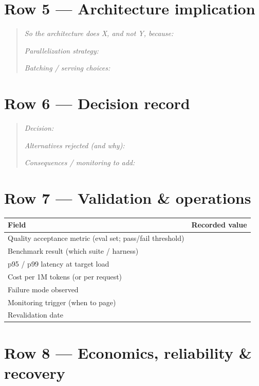 \section*{Row 5 --- Architecture implication} \label{ws:arch}

\begin{quote}
\emph{So the architecture does X, and not Y, because:} \hrulefill

\emph{Parallelization strategy:} \hrulefill

\emph{Batching / serving choices:} \hrulefill
\end{quote}

\section*{Row 6 --- Decision record} \label{ws:decision}

\begin{quote}
\emph{Decision:} \hrulefill

\emph{Alternatives rejected (and why):} \hrulefill

\emph{Consequences / monitoring to add:} \hrulefill
\end{quote}

\section*{Row 7 --- Validation \& operations} \label{ws:validate}

\begin{tabular}{@{}p{4.6cm}p{5.2cm}@{}}
\toprule
\textbf{Field} & \textbf{Recorded value} \\
\midrule
Quality acceptance metric (eval set; pass/fail threshold) & \\
Benchmark result (which suite / harness) & \\
p95 / p99 latency at target load & \\
Cost per 1M tokens (or per request) & \\
Failure mode observed & \\
Monitoring trigger (when to page) & \\
Revalidation date & \\
\bottomrule
\end{tabular}

\section*{Row 8 --- Economics, reliability \& recovery} \label{ws:econ}

